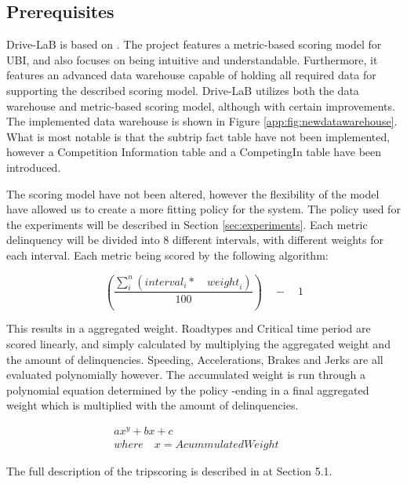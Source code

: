 \subsection{Prerequisites}\label{subsec:prereq}
Drive-LaB is based on \citep{sw9_report}. The project features a metric-based scoring model for UBI, and also focuses on being intuitive and understandable. Furthermore, it features an advanced data warehouse capable of holding all required data for supporting the described scoring model. Drive-LaB utilizes both the data warehouse and metric-based scoring model, although with certain improvements. The implemented data warehouse is shown in Figure \ref{app:fig:newdatawarehouse}. What is most notable is that the subtrip fact table have not been implemented, however a Competition Information table and a CompetingIn table have been introduced.

The scoring model have not been altered, however the flexibility of the model have allowed us to create a more fitting policy for the system. The policy used for the experiments will be described in Section \ref{sec:experiments}. Each metric delinquency will be divided into 8 different intervals, with different weights for each interval. Each metric being scored by the following algorithm:

$$
\left( \frac { \sum _{ i }^{ n }{ \left( { interval }_{ i }*\quad { weight }_{ i } \right)  }  }{ 100 }  \right) \quad -\quad 1
$$

This results in a aggregated weight. Roadtypes and Critical time period are scored linearly, and simply calculated by multiplying the aggregated weight and the amount of delinquencies. Speeding, Accelerations, Brakes and Jerks are all evaluated polynomially however. The accumulated weight is run through a polynomial equation determined by the policy -ending in a final aggregated weight which is multiplied with the amount of delinquencies.

\begin{align*}
ax^{y} + bx + c\quad \quad \quad \quad \quad \quad \quad \quad \quad \quad \quad \\
where\quad x = AcummulatedWeight
\end{align*}

The full description of the tripscoring is described in \citep{sw9_report} at Section 5.1.